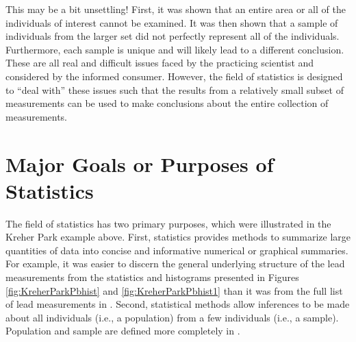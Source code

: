 \documentclass[10pt,openany]{book}\usepackage[]{graphicx}\usepackage[]{color}
\begin{document}

\vspace{-12pt}

This may be a bit unsettling!  First, it was shown that an entire area or all of the individuals of interest cannot be examined.  It was then shown that a sample of individuals from the larger set did not perfectly represent all of the individuals.  Furthermore, each sample is unique and will likely lead to a different conclusion.  These are all real and difficult issues faced by the practicing scientist and considered by the informed consumer.  However, the field of statistics is designed to ``deal with'' these issues such that the results from a relatively small subset of measurements can be used to make conclusions about the entire collection of measurements.



\section{Major Goals or Purposes of Statistics}
The field of statistics has two primary purposes, which were illustrated in the Kreher Park example above.  First, statistics provides methods to summarize large quantities of data into concise and informative numerical or graphical summaries.  For example, it was easier to discern the general underlying structure of the lead measurements from the statistics and histograms presented in Figures \ref{fig:KreherParkPbhist} and \ref{fig:KreherParkPbhist1} than it was from the full list of lead measurements in .  Second, statistical methods allow inferences to be made about all individuals (i.e., a population) from a few individuals (i.e., a sample).  Population and sample are defined more completely in .

\end{document}

